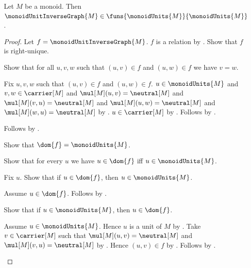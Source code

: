 \begin{theorem}\label{monoid_unit_inverse_graph_type}
    Let $M$ be a monoid.
    Then $\monoidUnitInverseGraph{M}\in
        \funs{\monoidUnits{M}}{\monoidUnits{M}}$.
\end{theorem}
\begin{proof}
    Let $f=\monoidUnitInverseGraph{M}$.
    $f$ is a relation by
        .
    Show that $f$ is right-unique.
    \begin{subproof}
        Show that for all $u,v,w$ such that $(u,v)\in f$ and
            $(u,w)\in f$ we have $v=w$.
        \begin{subproof}
            Fix $u,v,w$ such that $(u,v)\in f$ and $(u,w)\in f$.
            $u\in\monoidUnits{M}$ and $v,w\in\carrier[M]$ and
                $\mul[M](u,v)=\neutral[M]$ and
                $\mul[M](v,u)=\neutral[M]$ and
                $\mul[M](u,w)=\neutral[M]$ and
                $\mul[M](w,u)=\neutral[M]$ by
                .
            $u\in\carrier[M]$ by
                .
            Follows by .
        \end{subproof}
        Follows by .
    \end{subproof}
    Show that $\dom{f}=\monoidUnits{M}$.
    \begin{subproof}
        Show that for every $u$ we have
            $u\in\dom{f}$ iff $u\in\monoidUnits{M}$.
        \begin{subproof}
            Fix $u$.
            Show that if $u\in\dom{f}$, then
                $u\in\monoidUnits{M}$.
            \begin{subproof}
                Assume $u\in\dom{f}$.
                Follows by
                    .
            \end{subproof}
            Show that if $u\in\monoidUnits{M}$, then $u\in\dom{f}$.
            \begin{subproof}
                Assume $u\in\monoidUnits{M}$.
                Hence $u$ is a unit of $M$ by
                    .
                Take $v\in\carrier[M]$ such that
                    $\mul[M](u,v)=\neutral[M]$ and
                    $\mul[M](v,u)=\neutral[M]$ by
                    .
                Hence $(u,v)\in f$ by
                    .
                Follows by .

\end{subproof}
\end{subproof}
\end{subproof}
\end{proof}
